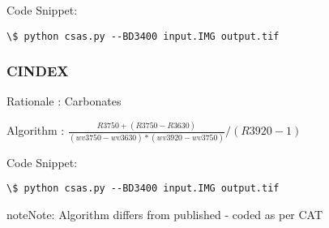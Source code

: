 \documentclass[letterpaper,10pt,english]{sphinxmanual}
\begin{document}
Code Snippet:

\begin{Verbatim}[commandchars=\\\{\}]
\$ python csas.py --BD3400 input.IMG output.tif
\end{Verbatim}


\subsubsection{CINDEX}
\label{Algorithms:cindex}
Rationale : Carbonates

Algorithm : $\frac{R3750 + (R3750 - R3630)}{(wv3750 - wv3630)*(wv3920 - wv3750)} / (R3920 - 1)$

Code Snippet:

\begin{Verbatim}[commandchars=\\\{\}]
\$ python csas.py --BD3400 input.IMG output.tif
\end{Verbatim}

\begin{notice}{note}{Note:}
Algorithm differs from published - coded as per CAT
\end{notice}



\renewcommand{\indexname}{Index}
\printindex
\end{document}

